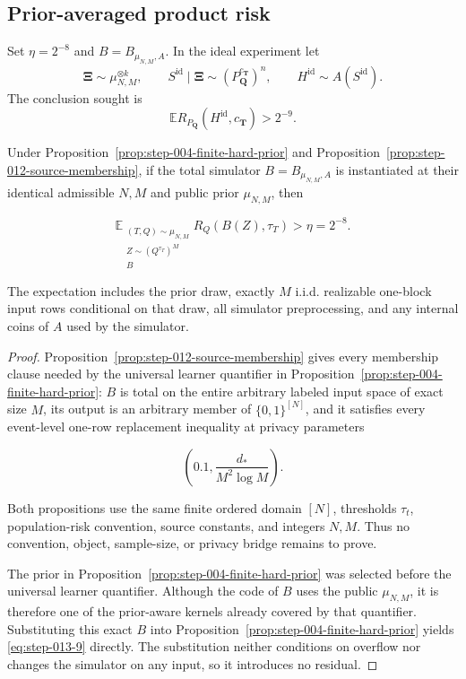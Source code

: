 \subsection{Prior-averaged product risk}\label{app:step-013}
Set $\eta=2^{-8}$ and $B=B_{\mu_{N,M},A}$.  In the ideal experiment let
\begin{equation}
\boldsymbol\Xi\sim\mu_{N,M}^{\otimes k},
\qquad
S^{\mathrm{id}}\mid\boldsymbol\Xi
\sim(P_{\boldsymbol Q}^{c_{\boldsymbol T}})^n,
\qquad
H^{\mathrm{id}}\sim A(S^{\mathrm{id}}).
\tag{S13.3}\label{eq:product-lower-experiment}
\end{equation}
The conclusion sought is
\begin{equation}
\mathbb E R_{P_{\boldsymbol Q}}(H^{\mathrm{id}},c_{\boldsymbol T})
>2^{-9}.
\tag{S13.4}\label{eq:prior-product-lower}
\end{equation}
\begin{proposition}\label{prop:step-013-simulator-hardness}
Under Proposition~\ref{prop:step-004-finite-hard-prior} and
Proposition~\ref{prop:step-012-source-membership}, if the total
simulator \(B=B_{\mu_{N,M},A}\) is instantiated at their identical
admissible \(N,M\) and public prior \(\mu_{N,M}\), then

\[
\mathbb E_{\substack{(T,Q)\sim\mu_{N,M}\\
                      Z\sim(Q^{\tau_T})^M\\ B}}
R_Q(B(Z),\tau_T)>\eta=2^{-8}.
\tag{S13.9}\label{eq:step-013-9}
\]

The expectation includes the prior draw, exactly \(M\) i.i.d. realizable
one-block input rows conditional on that draw, all simulator preprocessing,
and any internal coins of \(A\) used by the simulator.
\end{proposition}

\begin{proof}
Proposition~\ref{prop:step-012-source-membership} gives every
membership clause needed by the universal learner quantifier in Proposition~\ref{prop:step-004-finite-hard-prior}: \(B\) is total on the
entire arbitrary labeled input space of exact size \(M\), its output is an
arbitrary member of \(\{0,1\}^{[N]}\), and it satisfies every event-level
one-row replacement inequality at privacy parameters

\[
\left(0.1,\frac{d_*}{M^2\log M}\right).
\tag{S13.10}\label{eq:step-013-10}
\]

Both propositions use the same finite ordered domain \([N]\),
thresholds \(\tau_t\), population-risk convention, source constants, and
integers \(N,M\). Thus no convention, object, sample-size, or privacy bridge
remains to prove.

The prior in Proposition~\ref{prop:step-004-finite-hard-prior} was selected
before the universal learner
quantifier. Although the code of \(B\) uses the public
\(\mu_{N,M}\), it is therefore one of the prior-aware kernels already
covered by that quantifier. Substituting this exact \(B\) into
Proposition~\ref{prop:step-004-finite-hard-prior} yields
\eqref{eq:step-013-9} directly. The substitution neither conditions on overflow nor changes
the simulator on any input, so it introduces no residual. \end{proof}

